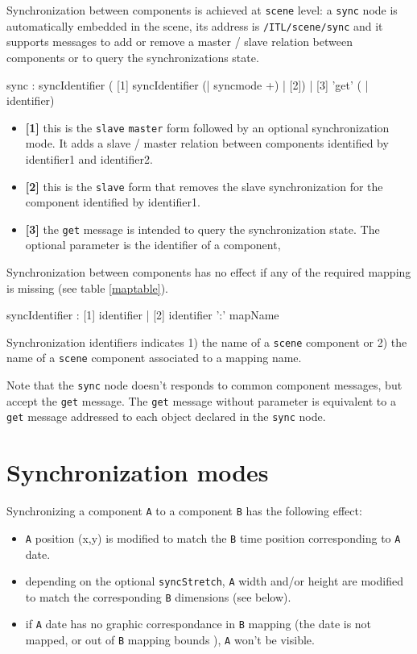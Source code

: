 \documentclass[a4paper,twoside]{report}
\newcommand{\sublevel}[1]	{\section{#1}}
\newcommand{\OSC}[1]		{\texttt{#1}}
\newcommand{\values}[1]	{\texttt{#1}}
\begin{document}
Synchronization between components is achieved at \OSC{scene} level: a \OSC{sync} node is automatically embedded in the scene, its address is \OSC{/ITL/scene/sync} and it supports messages to add or remove a master / slave relation between components or to query the synchronizations state.
\begin{rail}
sync : syncIdentifier 
	 ( [1] syncIdentifier (| syncmode +) 
	   | [2])
	   | [3] 'get' ( | identifier)
\end{rail}


\begin{itemize}
\item \textbf{[1]} this is the \OSC{slave} \OSC{master} form followed by an optional synchronization mode. It adds a slave / master relation between components identified by identifier1 and identifier2. \\
\item \textbf{[2]} this is the \OSC{slave} form that removes the slave synchronization for the component identified by identifier1.
\item \textbf{[3]} the \OSC{get} message is intended to query the synchronization state. The optional parameter is the identifier of a component,
\end{itemize}
Synchronization between components has no effect if any of the required mapping is missing (see table \ref{maptable}).

\begin{rail}
syncIdentifier : [1] identifier 
		| [2] identifier ':' mapName
\end{rail}

Synchronization identifiers indicates 1) the name of a \OSC{scene} component or 2) the name of a \OSC{scene} component associated to a mapping name.


Note that the \OSC{sync} node doesn't responds to common component messages, but accept the \OSC{get} message. 
The \OSC{get} message without parameter is equivalent to a \OSC{get} message addressed to each object declared in the \OSC{sync} node.

\sublevel{Synchronization modes}

Synchronizing a component \values{A} to a component \values{B} has the following effect:
\begin{itemize}
\item \values{A} position (x,y) is modified to match the \values{B} time position corresponding to \values{A} date.
\item depending on the optional \OSC{syncStretch}, \values{A} width and/or height are modified to match the  corresponding \values{B} dimensions (see below).
\item if \values{A} date has no graphic correspondance in \values{B} mapping (the date is not mapped, or out of \values{B} mapping bounds ), \values{A} won't be visible.
\end{itemize}
\end{document}
